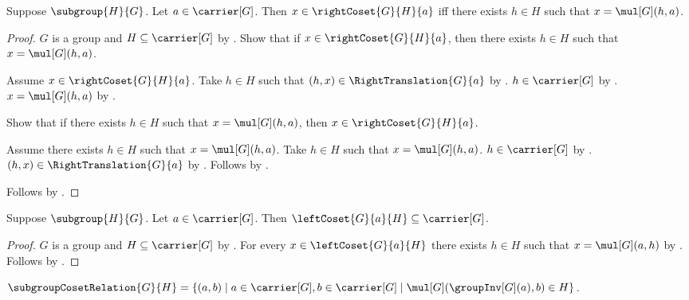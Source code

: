 \begin{proposition}\label{right_coset_iff}
    Suppose $\subgroup{H}{G}$.
    Let $a\in\carrier[G]$.
    Then $x\in\rightCoset{G}{H}{a}$ iff
        there exists $h\in H$ such that $x=\mul[G](h,a)$.
\end{proposition}
\begin{proof}
    $G$ is a group and $H\subseteq\carrier[G]$ by
        .
    Show that if $x\in\rightCoset{G}{H}{a}$, then
        there exists $h\in H$ such that $x=\mul[G](h,a)$.
    \begin{subproof}
        Assume $x\in\rightCoset{G}{H}{a}$.
        Take $h\in H$ such that
            $(h,x)\in\RightTranslation{G}{a}$ by
            .
        $h\in\carrier[G]$ by .
        $x=\mul[G](h,a)$ by .
    \end{subproof}
    Show that if there exists $h\in H$ such that
        $x=\mul[G](h,a)$, then $x\in\rightCoset{G}{H}{a}$.
    \begin{subproof}
        Assume there exists $h\in H$ such that $x=\mul[G](h,a)$.
        Take $h\in H$ such that $x=\mul[G](h,a)$.
        $h\in\carrier[G]$ by .
        $(h,x)\in\RightTranslation{G}{a}$ by
            .
        Follows by .
    \end{subproof}
    Follows by \auto.
\end{proof}

\begin{proposition}\label{left_coset_subseteq}
    Suppose $\subgroup{H}{G}$.
    Let $a\in\carrier[G]$.
    Then $\leftCoset{G}{a}{H}\subseteq\carrier[G]$.
\end{proposition}
\begin{proof}
    $G$ is a group and $H\subseteq\carrier[G]$ by
        .
    For every $x\in\leftCoset{G}{a}{H}$ there exists $h\in H$ such that
        $x=\mul[G](a,h)$ by .
    Follows by
        .
\end{proof}

\begin{definition}\label{subgroup_coset_relation}
    $\subgroupCosetRelation{G}{H}=
        \{(a,b)\mid a\in\carrier[G],b\in\carrier[G]\mid
            \mul[G](\groupInv[G](a),b)\in H\}$.
\end{definition}

